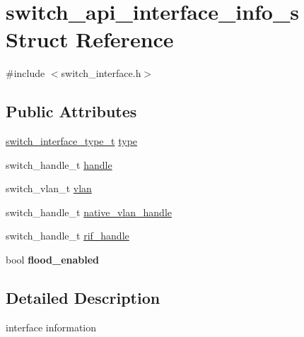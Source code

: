 \hypertarget{structswitch__api__interface__info__s}{\section{switch\+\_\+api\+\_\+interface\+\_\+info\+\_\+s Struct Reference}
\label{structswitch__api__interface__info__s}
}


{\ttfamily \#include $<$switch\+\_\+interface.\+h$>$}

\subsection*{Public Attributes}
\begin{DoxyCompactItemize}
\item 
\hyperlink{group__Interface_ga6052d8868148cccd877ca7b8dc42e778}{switch\+\_\+interface\+\_\+type\+\_\+t} \hyperlink{structswitch__api__interface__info__s_a8e9b5d65d2c2a6b6da18aa8a444b1b86}{type}
\item 
switch\+\_\+handle\+\_\+t \hyperlink{structswitch__api__interface__info__s_a3da4493ff9c1f19c8b0462f6967cf2a8}{handle}
\item 
switch\+\_\+vlan\+\_\+t \hyperlink{structswitch__api__interface__info__s_a47e768f0b3674534b00eb1ce3ae91f26}{vlan}
\item 
switch\+\_\+handle\+\_\+t \hyperlink{structswitch__api__interface__info__s_a108c8a75675956fb8501fff211457a6b}{native\+\_\+vlan\+\_\+handle}
\item 
switch\+\_\+handle\+\_\+t \hyperlink{structswitch__api__interface__info__s_a599487b4808637df2c2cf36448748094}{rif\+\_\+handle}
\item 
\hypertarget{structswitch__api__interface__info__s_aed8e2b687d0b684e6be0d10182a44ce3}{bool {\bfseries flood\+\_\+enabled}}\label{structswitch__api__interface__info__s_aed8e2b687d0b684e6be0d10182a44ce3}

\end{DoxyCompactItemize}


\subsection{Detailed Description}
interface information 

